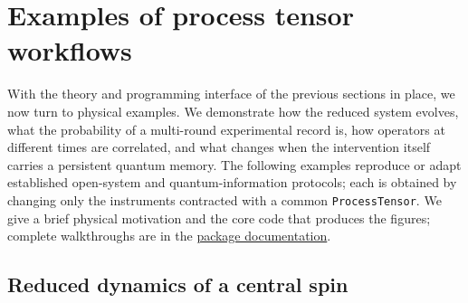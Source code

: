 \section{Examples of process tensor workflows}
\label{sec:pt-workflows}

With the theory and programming interface of the previous sections in place, we now turn to physical examples. 
We demonstrate how the reduced system evolves, what the probability of a multi-round experimental record is, how operators at different times are correlated, and what changes when the intervention itself carries a persistent quantum memory. 
The following examples reproduce or adapt established open-system and quantum-information protocols; each is obtained by changing only the instruments contracted with a common \texttt{ProcessTensor}. 
We give a brief physical motivation and the core code that produces the figures; complete walkthroughs are in the \href{https://gauthameshwar.github.io/ProcessTensors.jl/stable/}{package documentation}.

\subsection{Reduced dynamics of a central spin}
\label{subsec:workflow-central-spin}

